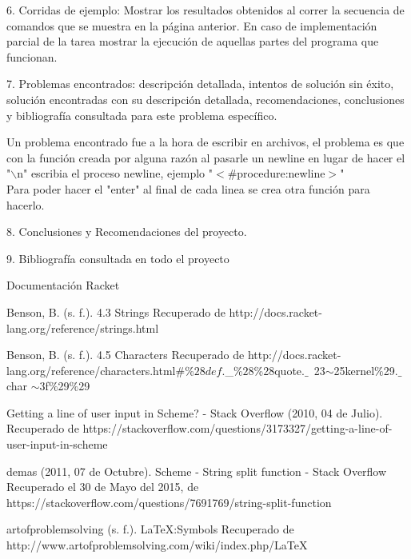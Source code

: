 \documentclass[12pt,a4paper]{report}
\begin{document}
\begin{flushleft}

6. Corridas de ejemplo: Mostrar los resultados obtenidos al correr la secuencia
de comandos que se muestra en la página anterior. En caso de
implementación parcial de la tarea mostrar la ejecución de aquellas partes
del programa que funcionan.

\end{flushleft}

\begin{flushleft}

7. Problemas encontrados: descripción detallada, intentos de solución sin éxito, solución encontradas con su descripción detallada, recomendaciones, conclusiones y bibliografía consultada para este problema específico.

Un problema encontrado fue a la hora de escribir en archivos, el problema es que con la función creada por alguna razón al pasarle un newline 
en lugar de hacer el "$\backslash$n" escribia el proceso newline, ejemplo "\(<\)$\#$procedure:newline\(>\)"\\
Para poder hacer el "enter" al final de cada linea se crea otra función para hacerlo.\\
 


\end{flushleft}

\begin{flushleft}

8. Conclusiones y Recomendaciones del proyecto.

\end{flushleft}

\begin{flushleft}

9. Bibliografía consultada en todo el proyecto




Documentación Racket

Benson, B. (s. f.). 4.3 Strings Recuperado de http://docs.racket-lang.org/reference/strings.html

Benson, B. (s. f.). 4.5 Characters Recuperado de http://docs.racket-lang.org/reference/characters.html$\#$\%$28def.$\_$\%28$\%28quote.$\_$~23$\sim$25kernel$\%$29.$\_$char
$\sim3$f$\%$29$\%$29

Getting a line of user input in Scheme? - Stack Overflow (2010, 04 de Julio). Recuperado de https://stackoverflow.com/questions/3173327/getting-a-line-of-user-input-in-scheme


demas (2011, 07 de Octubre). Scheme - String split function - Stack Overflow Recuperado el 30 de Mayo del 2015, de https://stackoverflow.com/questions/7691769/string-split-function


artofproblemsolving (s. f.). LaTeX:Symbols Recuperado de http://www.artofproblemsolving.com/wiki/index.php/LaTeX%








\end{flushleft}
\end{document}
